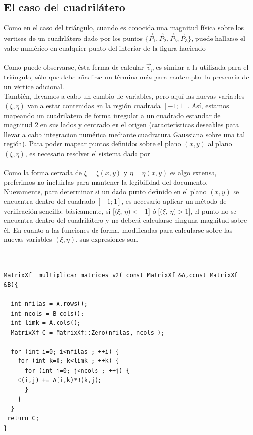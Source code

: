 \subsection{El caso del cuadrilátero}
\label{sec:cuadrilatero}
Como en el caso del triángulo, cuando es conocida una magnitud física sobre los vertices de un cuadrlátero dado por los puntos $ \lbrace \vec{P}_{1}, \vec{P}_{2}, \vec{P}_{3}, \vec{P}_{3}  \rbrace $, puede hallarse el valor numérico en cualquier punto del interior de la figura haciendo
\\
\\
Como puede observarse, ésta forma de calcular $ \vec{v}_{p} $ es similar a la utilizada para el triángulo, sólo que debe añadirse un término más para contemplar la presencia de un vértice adicional.
\\
También, llevamos a cabo un cambio de variables, pero aquí las nuevas variables $(\xi, \eta)$ van a estar contenidas en la región cuadrada $[-1;1]$. Así, estamos mapeando un cuadrilatero de forma irregular a un cuadrado estandar de magnitud 2 en sus lados y centrado en el origen (características deseables para llevar a cabo integracion numérica mediante cuadratura Gaussiana sobre una tal región). Para poder mapear puntos definidos sobre el plano $(x,y)$ al plano $(\xi, \eta)$, es necesario resolver el sistema dado por 
\\
\\
Como la forma cerrada de $\xi= \xi(x,y)$ y $\eta= \eta(x,y)$ es algo extensa, preferimos no incluirlas para mantener la legibilidad del documento. \\
Nuevamente, para determinar si un dado punto definido en el plano $(x,y)$ se encuentra dentro del cuadrado $[-1; 1]$, es necesario aplicar un método de verificación sencillo: básicamente, si [$(\xi$, $\eta) <  -1$] ó [$(\xi$, $\eta) >  1  $], el punto no se encuentra dentro del cuadrilátero y no deberá calcularse ninguna magnitud sobre él. En cuanto a las funciones de forma, modificadas para calcularse sobre las nuevas variables $(\xi, \eta)$, sus expresiones son.
\\
\\




\lstset{language=C++, breaklines=true, basicstyle=\footnotesize}
\begin{lstlisting}[frame=single]

MatrixXf  multiplicar_matrices_v2( const MatrixXf &A,const MatrixXf &B){
								 
  int nfilas = A.rows();
  int ncols = B.cols();
  int limk = A.cols();
  MatrixXf C = MatrixXf::Zero(nfilas, ncols );
 
  for (int i=0; i<nfilas ; ++i) {
    for (int k=0; k<limk ; ++k) {
      for (int j=0; j<ncols ; ++j) {
	C(i,j) += A(i,k)*B(k,j);
      }  
    }
  }
 return C;
}

\end{lstlisting}

